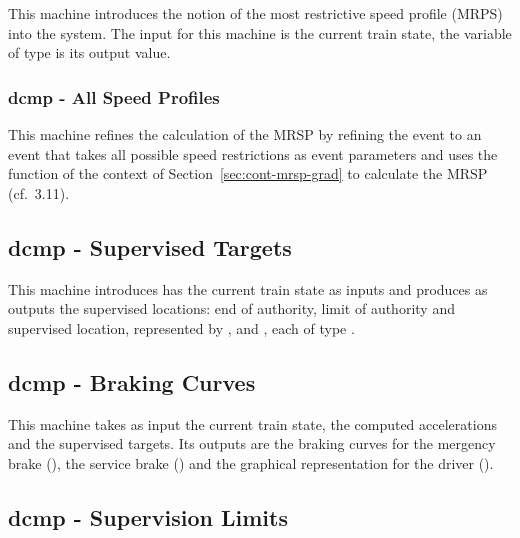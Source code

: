 \documentclass{template/openetcs_article}
\begin{document}
{This machine introduces the notion of the most restrictive speed profile (MRPS)
into the system. The input for this machine is the current train state, the
variable  of type  is its output value.

{\footnotesize

}

\subsubsection{dcmp - All Speed Profiles}
\label{sec:dcmp-all-speed}

This machine refines the calculation of the MRSP by refining the event
 to an event that takes all possible speed restrictions as
event parameters and uses the function of the context of
Section~\ref{sec:cont-mrsp-grad} to calculate the MRSP (cf.~3.11).

{\footnotesize

}

\subsection{dcmp - Supervised Targets}
\label{sec:dcmp-superv-targ}

This machine introduces has the current train state as inputs and produces as
outputs the supervised locations: end of authority, limit of authority and
supervised location, represented by ,  and , each
of type .

{\footnotesize

}

\subsection{dcmp - Braking Curves}
\label{sec:dcmp-braking-curves}

This machine takes as input the current train state, the computed accelerations
and the supervised targets. Its outputs are the braking curves for the mergency
brake (), the service brake () and the graphical
representation for the driver ().

{\footnotesize

}

\subsection{dcmp - Supervision Limits}
\label{sec:dcmp-superv-limits}

}
\end{document}
